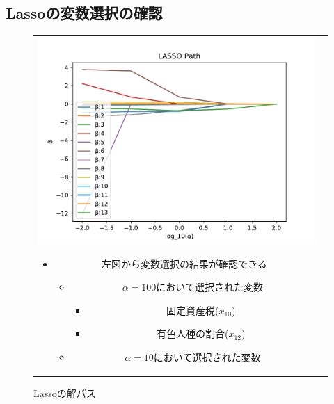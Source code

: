 \documentclass[dvipdfmx, 10pt]{beamer}
\begin{document}
\subsection{Lassoの変数選択の確認}
\begin{frame}{\insertsubsection}
    \begin{figure}[H]
            \begin{tabular}{cc}
            	 \begin{minipage}{0.5\hsize}
                   	 \includegraphics[width=1.0\linewidth]{../img/lassoPath.pdf}
            		 \caption{Lassoの解パス}
            		 \label{fig:lasso}
            	\end{minipage}
	 	\begin{minipage}{0.5\hsize}
			\begin{itemize}
                               \item 左図から変数選択の結果が確認できる
                                   \begin{itemize}
                                       \item $\alpha=100$において選択された変数
                                        \begin{itemize}
                                            \item 固定資産税($x_{10}$)
                                            \item 有色人種の割合($x_{12}$)
                                       \end{itemize}
                                      \item $\alpha=10$において選択された変数

\end{itemize}
\end{itemize}
\end{minipage}
\end{tabular}
\end{figure}
\end{frame}
\end{document}
